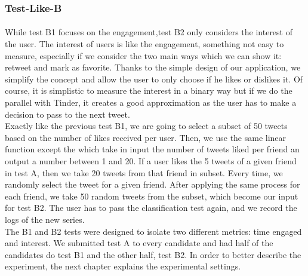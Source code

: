 \subsubsection{Test-Like-B}

\paragraph{}
While test B1 focuses on the engagement,test B2 only considers the interest of the user. The interest of users is like the engagement, something not easy to measure, especially if we consider the two main ways which we can show it: retweet and mark as favorite. Thanks to the simple design of our application, we simplify the concept and allow the user to only choose if he likes or dislikes it. Of course, it is simplistic to measure the interest in a binary way but if we do the parallel with Tinder, it creates a good approximation as the user has to make a decision to pass to the next tweet. \\
Exactly like the previous test B1, we are going to select a subset of 50 tweets based on the number of likes received per user. Then, we use the same linear function except the  which take in input the number of tweets liked per friend an output a number between 1 and 20. If a user likes the 5 tweets of a given friend in test A, then we take 20 tweets from that friend in subset. Every time, we randomly select the tweet for a given friend. After applying the same process for each friend, we take 50 random tweets from the subset, which become our input for test B2. The user has to pass the classification test again, and we record the logs of the new series. \\
The B1 and B2 tests were designed to isolate two different metrics: time engaged and interest. We submitted test A to every candidate and had half of the candidates do test B1 and the other half, test B2. In order to better describe the experiment, the next chapter explains the experimental settings.